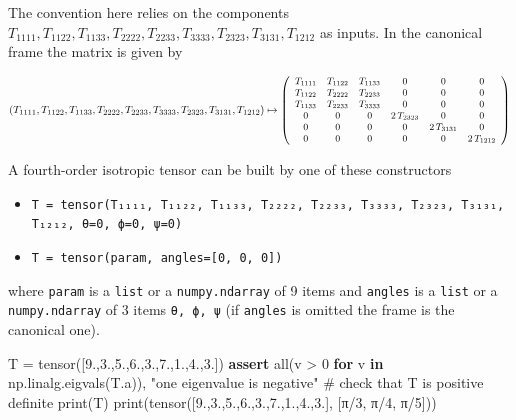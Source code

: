 \documentclass[
  letterpaper,
  DIV=11,
  numbers=noendperiod]{scrreprt}
\newenvironment{Shaded}{\begin{snugshade}}{\end{snugshade}}
\newcommand{\BuiltInTok}[1]{\textcolor[rgb]{0.00,0.23,0.31}{#1}}
\newcommand{\CommentTok}[1]{\textcolor[rgb]{0.37,0.37,0.37}{#1}}
\newcommand{\ControlFlowTok}[1]{\textcolor[rgb]{0.00,0.23,0.31}{\textbf{#1}}}
\newcommand{\DecValTok}[1]{\textcolor[rgb]{0.68,0.00,0.00}{#1}}
\newcommand{\FloatTok}[1]{\textcolor[rgb]{0.68,0.00,0.00}{#1}}
\newcommand{\KeywordTok}[1]{\textcolor[rgb]{0.00,0.23,0.31}{\textbf{#1}}}
\newcommand{\NormalTok}[1]{\textcolor[rgb]{0.00,0.23,0.31}{#1}}
\newcommand{\OperatorTok}[1]{\textcolor[rgb]{0.37,0.37,0.37}{#1}}
\newcommand{\StringTok}[1]{\textcolor[rgb]{0.13,0.47,0.30}{#1}}
\providecommand{\tightlist}{%
  \setlength{\itemsep}{0pt}\setlength{\parskip}{0pt}}\usepackage{longtable,booktabs,array}
\begin{document}
The convention here relies on the components
\(T_{1 1 1 1}, T_{1 1 2 2}, T_{1 1 3 3}, T_{2 2 2 2}, T_{2 2 3 3}, T_{3 3 3 3}, T_{2 3 2 3}, T_{3 1 3 1}, T_{1 2 1 2}\)
as inputs. In the canonical frame the matrix is given by

\[
\small
(T_{1 1 1 1}, T_{1 1 2 2}, T_{1 1 3 3}, T_{2 2 2 2}, T_{2 2 3 3}, T_{3 3 3 3}, T_{2 3 2 3}, T_{3 1 3 1}, T_{1 2 1 2})
\mapsto
\left(
\begin{array}{cccccc}
T_{1 1 1 1} & T_{1 1 2 2} & T_{1 1 3 3} & 0 & 0 & 0 \\
T_{1 1 2 2} & T_{2 2 2 2} & T_{2 2 3 3} & 0 & 0 & 0 \\
T_{1 1 3 3} & T_{2 2 3 3} & T_{3 3 3 3} & 0 & 0 & 0 \\
0 & 0 & 0 & 2 \, T_{2 3 2 3} & 0 & 0 \\
0 & 0 & 0 & 0 & 2 \, T_{3 1 3 1} & 0 \\
0 & 0 & 0 & 0 & 0 & 2 \, T_{1 2 1 2} \\
\end{array}
\right)
\]

A fourth-order isotropic tensor can be built by one of these
constructors

\begin{itemize}
\tightlist
\item
  \texttt{T\ =\ tensor(T₁₁₁₁,\ T₁₁₂₂,\ T₁₁₃₃,\ T₂₂₂₂,\ T₂₂₃₃,\ T₃₃₃₃,\ T₂₃₂₃,\ T₃₁₃₁,\ T₁₂₁₂,\ θ=0,\ ϕ=0,\ ψ=0)}
\item
  \texttt{T\ =\ tensor(param,\ angles={[}0,\ 0,\ 0{]})}
\end{itemize}

where \texttt{param} is a \texttt{list} or a \texttt{numpy.ndarray} of 9
items and \texttt{angles} is a \texttt{list} or a \texttt{numpy.ndarray}
of 3 items \texttt{θ,\ ϕ,\ ψ} (if \texttt{angles} is omitted the frame
is the canonical one).

\begin{Shaded}
\begin{Highlighting}[]
\NormalTok{T }\OperatorTok{=}\NormalTok{ tensor([}\FloatTok{9.}\NormalTok{,}\FloatTok{3.}\NormalTok{,}\FloatTok{5.}\NormalTok{,}\FloatTok{6.}\NormalTok{,}\FloatTok{3.}\NormalTok{,}\FloatTok{7.}\NormalTok{,}\FloatTok{1.}\NormalTok{,}\FloatTok{4.}\NormalTok{,}\FloatTok{3.}\NormalTok{])}
\ControlFlowTok{assert} \BuiltInTok{all}\NormalTok{(v }\OperatorTok{\textgreater{}} \DecValTok{0} \ControlFlowTok{for}\NormalTok{ v }\KeywordTok{in}\NormalTok{ np.linalg.eigvals(T.a)), }\StringTok{"one eigenvalue is negative"} \CommentTok{\# check that T is positive definite}
\BuiltInTok{print}\NormalTok{(T)}
\BuiltInTok{print}\NormalTok{(tensor([}\FloatTok{9.}\NormalTok{,}\FloatTok{3.}\NormalTok{,}\FloatTok{5.}\NormalTok{,}\FloatTok{6.}\NormalTok{,}\FloatTok{3.}\NormalTok{,}\FloatTok{7.}\NormalTok{,}\FloatTok{1.}\NormalTok{,}\FloatTok{4.}\NormalTok{,}\FloatTok{3.}\NormalTok{], [π}\OperatorTok{/}\DecValTok{3}\NormalTok{, π}\OperatorTok{/}\DecValTok{4}\NormalTok{, π}\OperatorTok{/}\DecValTok{5}\NormalTok{]))}
\end{Highlighting}
\end{Shaded}
\end{document}
